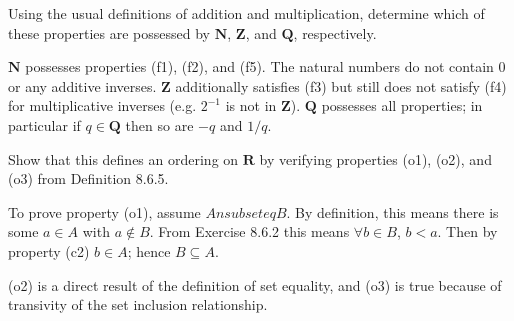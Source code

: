 \begin{exercise}
Using the usual definitions of addition and multiplication, determine which of these properties are possessed by \(\mathbf{N}\), \(\mathbf{Z}\), and \(\mathbf{Q}\), respectively.
\end{exercise}
\begin{solution}
\(\mathbf{N}\) possesses properties (f1), (f2), and (f5). The natural numbers do not contain 0 or any additive inverses. \(\mathbf{Z}\) additionally satisfies (f3) but still does not satisfy (f4) for multiplicative inverses (e.g. \(2^{-1}\) is not in \(\mathbf{Z}\)). \(\mathbf{Q}\) possesses all properties; in particular if \(q \in \mathbf{Q}\) then so are \(-q\) and \(1/q\).
\end{solution}

\begin{exercise}
Show that this defines an ordering on \(\mathbf{R}\) by verifying properties (o1), (o2), and (o3) from Definition 8.6.5.
\end{exercise}
\begin{solution}
To prove property (o1), assume \(A nsubseteq B\). By definition, this means there is some  \(a \in A\) with \(a \notin B\). From Exercise 8.6.2 this means \(\forall b \in B\), \(b < a\). Then by property (c2) \(b \in A\); hence \(B \subseteq A\).

(o2) is a direct result of the definition of set equality, and (o3) is true because of transivity of the set inclusion relationship.
\end{solution}


